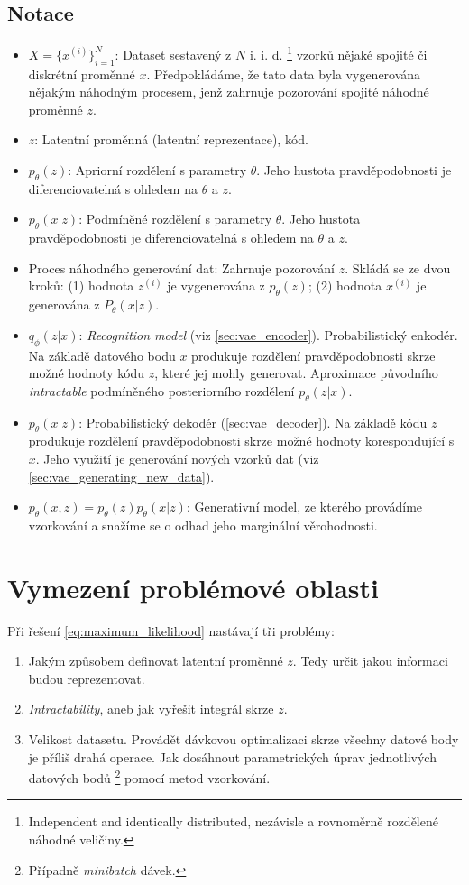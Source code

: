 \subsection{Notace}
\begin{itemize}
    \item $X = \{ x^{(i)} \}^N_{i=1}$: Dataset sestavený z $N$ i. i. d. \footnote{Independent and identically distributed, nezávisle a rovnoměrně rozdělené náhodné veličiny.} vzorků nějaké spojité či diskrétní proměnné $x$. 
    Předpokládáme, že tato data byla vygenerována nějakým náhodným procesem, jenž zahrnuje pozorování spojité náhodné proměnné $z$.
    \item $z$: Latentní proměnná (latentní reprezentace), kód.
    \item $p_\theta(z)$: Apriorní rozdělení s parametry $\theta$. Jeho hustota pravděpodobnosti je diferenciovatelná s ohledem na $\theta$ a $z$.
    \item $p_\theta(x|z)$: Podmíněné rozdělení s parametry $\theta$. Jeho hustota pravděpodobnosti je diferenciovatelná s ohledem na $\theta$ a $z$.
    \item Proces náhodného generování dat: Zahrnuje pozorování $z$. Skládá se ze dvou kroků: (1) hodnota $z^{(i)}$ je vygenerována z $p_\theta(z)$; (2) hodnota $x^{(i)}$ je generována z $P_\theta(x|z)$.
    \item $q_\phi(z|x)$: \emph{Recognition model} (viz \autoref{sec:vae_encoder}). Probabilistický enkodér. Na základě datového bodu $x$ produkuje rozdělení pravděpodobnosti skrze možné hodnoty kódu $z$, které jej mohly generovat. Aproximace původního \emph{intractable} podmíněného posteriorního rozdělení $p_\theta(z|x)$.
    \item $p_\theta(x|z)$: Probabilistický dekodér (\autoref{sec:vae_decoder}). Na základě kódu $z$ produkuje rozdělení pravděpodobnosti skrze možné hodnoty korespondující s $x$. Jeho využití je generování nových vzorků dat (viz \autoref{sec:vae_generating_new_data}).
    \item $p_\theta(x, z) = p_\theta(z) p_\theta(x|z)$: Generativní model, ze kterého provádíme vzorkování a snažíme se o odhad jeho marginální věrohodnosti.
\end{itemize}

\section{Vymezení problémové oblasti}
Při řešení \autoref{eq:maximum_likelihood} nastávají tři problémy:
\begin{enumerate}
    \item Jakým způsobem definovat latentní proměnné $z$. Tedy určit jakou informaci budou reprezentovat.
    \item \emph{Intractability}, aneb jak vyřešit integrál skrze $z$. \cite[Sekce 2.1.]{Kingma2014}
    \item Velikost datasetu. Provádět dávkovou optimalizaci skrze všechny datové body je příliš drahá operace. Jak dosáhnout parametrických úprav jednotlivých datových bodů \footnote{Případně \emph{minibatch} dávek.} pomocí metod vzorkování.
\end{enumerate}

